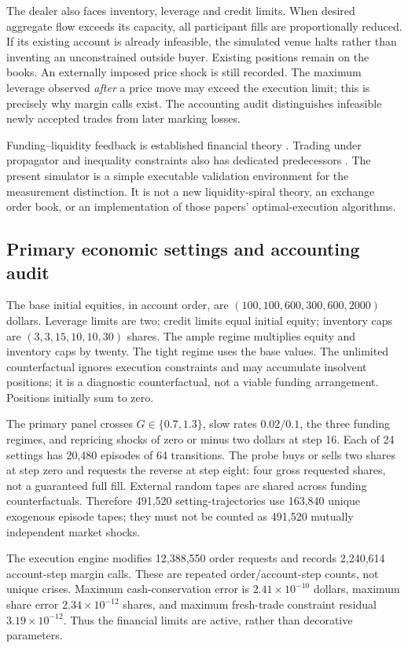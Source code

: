 The dealer also faces inventory, leverage and credit limits. When desired aggregate flow exceeds its capacity, all participant fills are proportionally reduced. If its existing account is already infeasible, the simulated venue halts rather than inventing an unconstrained outside buyer. Existing positions remain on the books. An externally imposed price shock is still recorded. The maximum leverage observed \emph{after} a price move may exceed the execution limit; this is precisely why margin calls exist. The accounting audit distinguishes infeasible newly accepted trades from later marking losses.

Funding--liquidity feedback is established financial theory \citep{brunnermeier2009}. Trading under propagator and inequality constraints also has dedicated predecessors \citep{abijaber2024}. The present simulator is a simple executable validation environment for the measurement distinction. It is not a new liquidity-spiral theory, an exchange order book, or an implementation of those papers' optimal-execution algorithms.

\subsection{Primary economic settings and accounting audit}
The base initial equities, in account order, are $(100,100,600,300,600,2000)$ dollars. Leverage limits are two; credit limits equal initial equity; inventory caps are $(3,3,15,10,10,30)$ shares. The ample regime multiplies equity and inventory caps by twenty. The tight regime uses the base values. The unlimited counterfactual ignores execution constraints and may accumulate insolvent positions; it is a diagnostic counterfactual, not a viable funding arrangement. Positions initially sum to zero.

The primary panel crosses $G\in\{0.7,1.3\}$, slow rates $0.02/0.1$, the three funding regimes, and repricing shocks of zero or minus two dollars at step 16. Each of 24 settings has 20,480 episodes of 64 transitions. The probe buys or sells two shares at step zero and requests the reverse at step eight: four gross requested shares, not a guaranteed full fill. External random tapes are shared across funding counterfactuals. Therefore 491,520 setting-trajectories use 163,840 unique exogenous episode tapes; they must not be counted as 491,520 mutually independent market shocks.

The execution engine modifies 12,388,550 order requests and records 2,240,614 account-step margin calls. These are repeated order/account-step counts, not unique crises. Maximum cash-conservation error is $2.41\times10^{-10}$ dollars, maximum share error $2.34\times10^{-12}$ shares, and maximum fresh-trade constraint residual $3.19\times10^{-12}$. Thus the financial limits are active, rather than decorative parameters.

